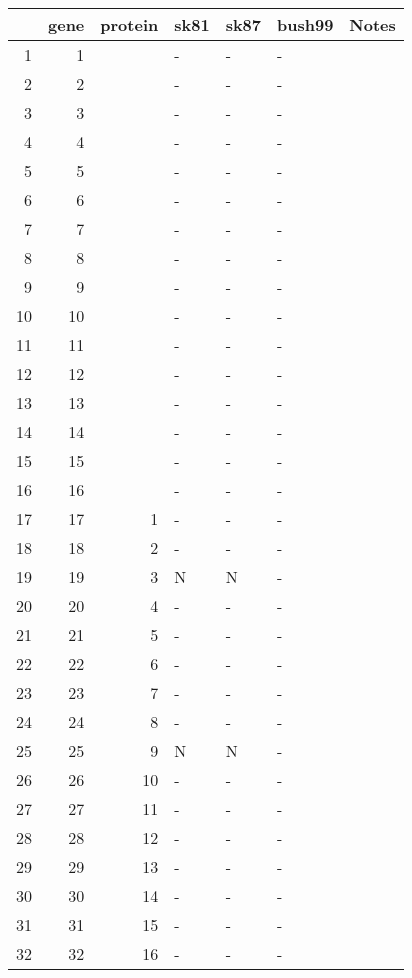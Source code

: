 \begin{longtable}{rrrllll}
  \hline
 & gene & protein & sk81 & sk87 & bush99 & Notes \\ 
  \hline
1 &   1 &  & - & - & - &  \\ 
  2 &   2 &  & - & - & - &  \\ 
  3 &   3 &  & - & - & - &  \\ 
  4 &   4 &  & - & - & - &  \\ 
  5 &   5 &  & - & - & - &  \\ 
  6 &   6 &  & - & - & - &  \\ 
  7 &   7 &  & - & - & - &  \\ 
  8 &   8 &  & - & - & - &  \\ 
  9 &   9 &  & - & - & - &  \\ 
  10 &  10 &  & - & - & - &  \\ 
  11 &  11 &  & - & - & - &  \\ 
  12 &  12 &  & - & - & - &  \\ 
  13 &  13 &  & - & - & - &  \\ 
  14 &  14 &  & - & - & - &  \\ 
  15 &  15 &  & - & - & - &  \\ 
  16 &  16 &  & - & - & - &  \\ 
  17 &  17 &   1 & - & - & - &  \\ 
  18 &  18 &   2 & - & - & - &  \\ 
  19 &  19 &   3 & N & N & - &  \\ 
  20 &  20 &   4 & - & - & - &  \\ 
  21 &  21 &   5 & - & - & - &  \\ 
  22 &  22 &   6 & - & - & - &  \\ 
  23 &  23 &   7 & - & - & - &  \\ 
  24 &  24 &   8 & - & - & - &  \\ 
  25 &  25 &   9 & N & N & - &  \\ 
  26 &  26 &  10 & - & - & - &  \\ 
  27 &  27 &  11 & - & - & - &  \\ 
  28 &  28 &  12 & - & - & - &  \\ 
  29 &  29 &  13 & - & - & - &  \\ 
  30 &  30 &  14 & - & - & - &  \\ 
  31 &  31 &  15 & - & - & - &  \\ 
  32 &  32 &  16 & - & - & - &  \\ 

\end{longtable}
